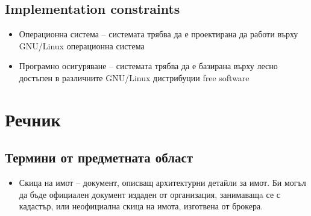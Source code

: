 \documentclass[a4paper]{article}
\begin{document}
\subsection{Implementation constraints}
\begin{itemize}
\item Операционна система -- системата трябва да е проектирана да работи върху GNU/Linux операционна система
\item Програмно осигуряване -- системата трябва да е базирана върху лесно достъпен в различните GNU/Linux дистрибуции free software
\end{itemize}




\section{Речник} \label{kpacu}

\subsection{Термини от предметната област}
\begin{itemize}
\item Скица на имот -- документ, описващ архитектурни детайли за имот. Би могъл да бъде официален документ издаден от организация, занимаващa се с кадастър, или неофициална скица на имота, изготвена от брокера.
\end{itemize}
\end{document}
